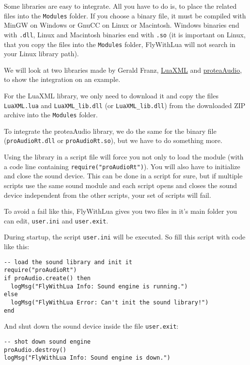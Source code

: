 \documentclass[11pt,parskip=half,a4paper]{scrartcl}
\begin{document}
Some libraries are easy to integrate. All you have to do is, to place the related files into the \verb|Modules| folder. If you choose a binary file, it must be compiled with MinGW on Windows or GnuCC on Linux or Macintosh. Windows binaries end with \verb|.dll|, Linux and Macintosh binaries end with \verb|.so| (it is important on Linux, that you copy the files into the \verb|Modules| folder, FlyWithLua will not search in your Linux library path).

We will look at two libraries made by Gerald Franz, \href{http://viremo.eludi.net/LuaXML/index.html}{LuaXML} and \href{http://viremo.eludi.net/proteaAudio/proteaaudiolua.html}{proteaAudio}, to show the integration on an example.

For the LuaXML library, we only need to download it and copy the files \verb|LuaXML.lua| and \verb|LuaXML_lib.dll| (or \verb|LuaXML_lib.dll|) from the downloaded ZIP archive into the \verb|Modules| folder.

To integrate the proteaAudio library, we do the same for the binary file (\verb|proAudioRt.dll| or \verb|proAudioRt.so|), but we have to do something more.

Using the library in a script file will force you not only to load the module (with a code line containing \verb|require("proAudioRt")|). You will also have to initialize and close the sound device. This can be done in a script for sure, but if multiple scripts use the same sound module and each script opens and closes the sound device independent from the other scripts, your set of scripts will fail.

To avoid a fail like this, FlyWithLua gives you two files in it's main folder you can edit, \verb|user.ini| and \verb|user.exit|.

During startup, the script \verb|user.ini| will be executed. So fill this script with code like this:

\begin{lstlisting}[firstnumber=1]
-- load the sound library and init it
require("proAudioRt")
if proAudio.create() then
  logMsg("FlyWithLua Info: Sound engine is running.")
else
  logMsg("FlyWithLua Error: Can't init the sound library!")
end
\end{lstlisting}

And shut down the sound device inside the file \verb|user.exit|:

\begin{lstlisting}[firstnumber=1]
-- shot down sound engine
proAudio.destroy()
logMsg("FlyWithLua Info: Sound engine is down.")
\end{lstlisting}
\end{document}
